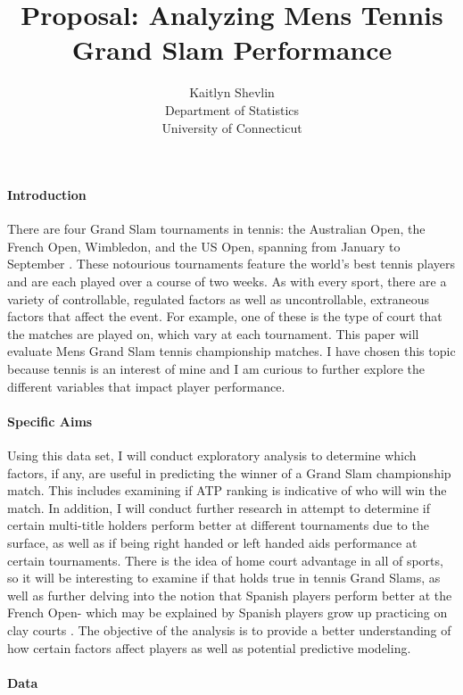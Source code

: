 \documentclass[12pt]{article}
\title{Proposal: Analyzing Mens Tennis Grand Slam Performance}
\author{Kaitlyn Shevlin\\
  Department of Statistics\\
  University of Connecticut
}
\begin{document}
\maketitle


\paragraph{Introduction}
There are four Grand Slam tournaments in tennis: the Australian Open,
the French Open, Wimbledon, and the US Open, spanning from January to 
September \citet{Ifttennis2021Grand}. These notourious tournaments 
feature the world's best tennis players and are each played over a 
course of two weeks.  As with every sport, there are a variety of 
controllable, regulated factors as well as uncontrollable, extraneous 
factors that affect the event. For example, one of these is the type of 
court that the matches are played on, which vary at each tournament. 
This paper will evaluate Mens Grand Slam tennis championship matches. 
I have chosen this topic because tennis is an interest of mine and I am 
curious to further explore the different variables that impact player 
performance.

\paragraph{Specific Aims}
Using this data set, I will conduct exploratory analysis to determine
which factors, if any, are useful in predicting the winner of a Grand
Slam championship match. This includes examining if ATP ranking is 
indicative of who will win the match. In addition, I will conduct 
further research in attempt to determine if certain multi-title holders 
perform better at different tournaments due to the surface, as well as 
if being right handed or left handed aids performance at certain 
tournaments. There is the idea of home court advantage in all of sports, 
so it will be interesting to examine if that holds true in tennis Grand 
Slams, as well as further delving into the notion that Spanish players 
perform better at the French Open- which may be explained by Spanish 
players grow up practicing on clay courts \citet{Jurejko2018French}. 
The objective of the analysis is to provide a better understanding of 
how certain factors affect players as well as potential predictive 
modeling.
 
\paragraph{Data}
\end{document}
